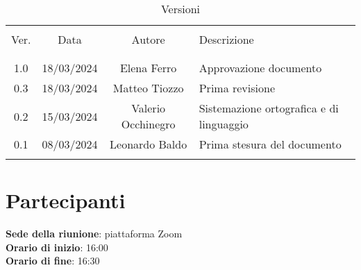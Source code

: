 \documentclass[italian,12pt]{article} %
\begin{document}


\newpage





\begin{table}[!h]
	\caption{Versioni}
	\begin{center}
		\begin{tabular}{ c c c p{9cm} }
			\hline \\[-2ex]
			Ver. & Data & Autore & Descrizione \\
			\\[-2ex] \hline \\[-1.5ex]
			1.0 & 18/03/2024 & Elena Ferro & Approvazione documento\\
			0.3 & 18/03/2024 & Matteo Tiozzo & Prima revisione \\
			0.2 & 15/03/2024 & Valerio Occhinegro& Sistemazione ortografica e di linguaggio \\
			0.1 & 08/03/2024 & Leonardo Baldo& Prima stesura del documento \\
			\\[-1.5ex] \hline
		\end{tabular}
	\end{center}
\end{table}
\newpage

\tableofcontents

\newpage

\section{Partecipanti}

\textbf{Sede della riunione}: piattaforma Zoom\\
\textbf{Orario di inizio}: 16:00\\
\textbf{Orario di fine}: 16:30\\
\end{document}
